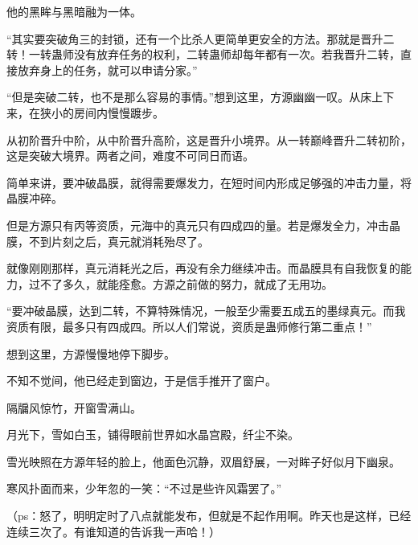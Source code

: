 \begin{this_body}
他的黑眸与黑暗融为一体。

“其实要突破角三的封锁，还有一个比杀人更简单更安全的方法。那就是晋升二转！一转蛊师没有放弃任务的权利，二转蛊师却每年都有一次。若我晋升二转，直接放弃身上的任务，就可以申请分家。”

“但是突破二转，也不是那么容易的事情。”想到这里，方源幽幽一叹。从床上下来，在狭小的房间内慢慢踱步。

从初阶晋升中阶，从中阶晋升高阶，这是晋升小境界。从一转巅峰晋升二转初阶，这是突破大境界。两者之间，难度不可同日而语。

简单来讲，要冲破晶膜，就得需要爆发力，在短时间内形成足够强的冲击力量，将晶膜冲碎。

但是方源只有丙等资质，元海中的真元只有四成四的量。若是爆发全力，冲击晶膜，不到片刻之后，真元就消耗殆尽了。

就像刚刚那样，真元消耗光之后，再没有余力继续冲击。而晶膜具有自我恢复的能力，过不了多久，就能痊愈。方源之前做的努力，就成了无用功。

“要冲破晶膜，达到二转，不算特殊情况，一般至少需要五成五的墨绿真元。而我资质有限，最多只有四成四。所以人们常说，资质是蛊师修行第二重点！”

想到这里，方源慢慢地停下脚步。

不知不觉间，他已经走到窗边，于是信手推开了窗户。

隔牖风惊竹，开窗雪满山。

月光下，雪如白玉，铺得眼前世界如水晶宫殿，纤尘不染。

雪光映照在方源年轻的脸上，他面色沉静，双眉舒展，一对眸子好似月下幽泉。

寒风扑面而来，少年忽的一笑：“不过是些许风霜罢了。”

（ps：怒了，明明定时了八点就能发布，但就是不起作用啊。昨天也是这样，已经连续三次了。有谁知道的告诉我一声哈！）

\end{this_body}

